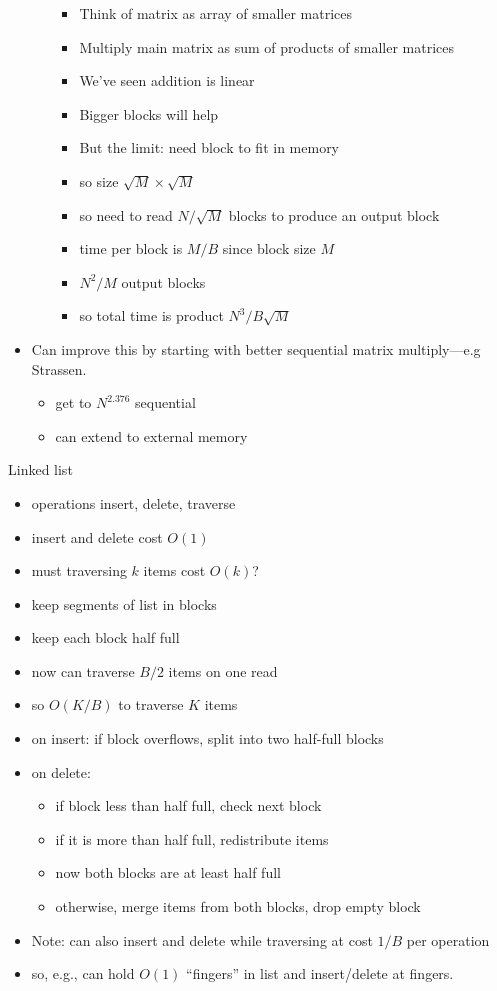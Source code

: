 \documentclass{article}
\begin{document}
\begin{itemize}
\begin{itemize}
\begin{itemize}
\item Think of matrix as array of smaller matrices
\item Multiply main matrix as sum of products of smaller matrices
\item We've seen addition is linear 
\item Bigger blocks will help
\item But the limit: need block to fit in memory
\item so size $\sqrt{M} \times \sqrt{M}$
\item so need to read $N/\sqrt{M}$ blocks to produce an output block
\item time per block is $M/B$ since block size $M$
\item $N^2/M$ output blocks
\item so total time is product $N^3/B\sqrt{M}$
\end{itemize}
\end{itemize}
\item Can improve this by starting with better sequential matrix
  multiply---e.g Strassen.  
\begin{itemize}
\item get to $N^{2.376}$ sequential
\item can extend to external memory
\end{itemize}
\end{itemize}



Linked list
\begin{itemize}
\item operations insert, delete, traverse
\item insert and delete cost $O(1)$
\item must traversing $k$ items cost $O(k)$?
\item keep segments of list in blocks
\item keep each block half full
\item now can traverse $B/2$ items on one read
\item so $O(K/B)$ to traverse $K$ items
\item on insert: if block overflows, split into two half-full blocks
\item on delete:
  \begin{itemize}
  \item if block less than half full, check next block
  \item if it is more than half full, redistribute items
  \item now both blocks are at least half full
  \item otherwise, merge items from both blocks, drop empty block
  \end{itemize}
\item Note: can also insert and delete while traversing at cost $1/B$
  per operation
\item so, e.g., can hold $O(1)$ ``fingers'' in list and insert/delete
  at fingers.
\end{itemize}
\end{document}
